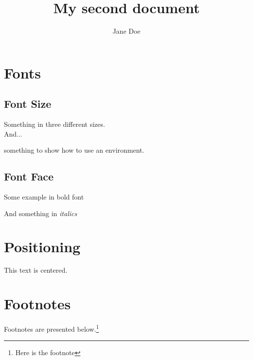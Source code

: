 \documentclass{article}
\title{My second document}
\author{Jane Doe}
\begin{document}
\maketitle
\tableofcontents{}

\section{Fonts}
\subsection{Font Size}
Something in {\tiny{three}} {\large{different}} {\huge{sizes}}.\\

And... 
\begin{footnotesize}
something to show how to use an environment.
\end{footnotesize}

\subsection{Font Face}
\begin{bf}
Some example in bold font
\end{bf}

And something in {\textit{italics}}


\section{Positioning}

\begin{center}
This text is centered.
\end{center}

\section{Footnotes}
Footnotes are presented below.\footnote{Here is the footnote}
\end{document}
